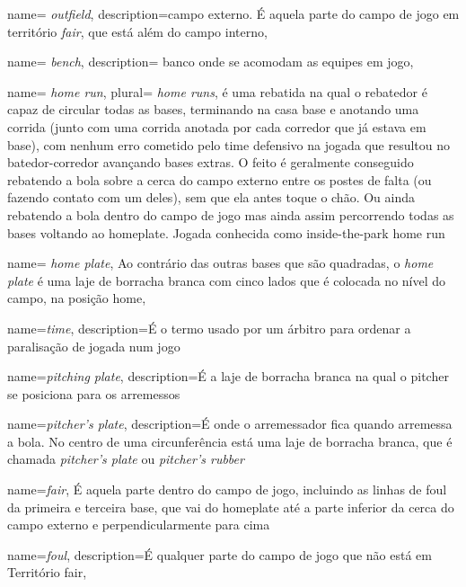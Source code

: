 {
 name= \textit{outfield},
 description={campo externo. \'E aquela parte do campo de jogo em territ\'orio \textit{fair}, que est\'a al\'em do campo interno},
}

{
 name= \textit{bench},
 description={ banco onde se acomodam as equipes em jogo},
}

{
 name= \textit{home run},
 plural= \textit{home runs},
}{é uma rebatida na qual o rebatedor é capaz de circular todas as bases, terminando na casa base e anotando uma corrida (junto com uma corrida anotada por cada corredor que já estava em base), com nenhum erro cometido pelo time defensivo na jogada que resultou no batedor-corredor avançando bases extras. O feito é geralmente conseguido rebatendo a bola sobre a cerca do campo externo entre os postes de falta (ou fazendo contato com um deles), sem que ela antes toque o chão. Ou ainda rebatendo a bola dentro do campo de jogo mas ainda assim percorrendo todas as bases voltando ao \gls{homeplate}. Jogada conhecida como inside-the-park home run}

{
 name= \textit{home plate},
}
{ Ao contr\'ario das outras bases que são quadradas, o \textit{home plate} \'e uma laje de borracha branca com cinco lados que \'e colocada no nível do campo, na posi\c{c}\~ao \gls{home},
}

{
 name=\textit{time},
 description={\'E o termo usado por um \'arbitro para ordenar a paralisa\c{c}\~ao de jogada num jogo}
}


{
 name=\textit{pitching plate},
 description={\'E a laje de borracha branca na qual o \gls{pitcher} se posiciona para os arremessos}
}

{
 name=\textit{pitcher's plate},
 description={\'E onde o arremessador fica quando arremessa a bola. No centro de uma circunfer\^encia est\'a uma laje de borracha branca, que \'e chamada \textit{pitcher's plate} ou \textit{pitcher's rubber}}
}

{
 name=\textit{fair},
}{\'E aquela parte dentro do campo de jogo, incluindo as linhas de \gls{foul} da primeira e terceira base, que vai do \gls{homeplate} at\'e a parte inferior da cerca do campo externo e perpendicularmente para cima}


{
 name=\textit{foul},
 description={\'E qualquer parte do campo de jogo que n\~ao est\'a em Territ\'orio \gls{fair}},
}



